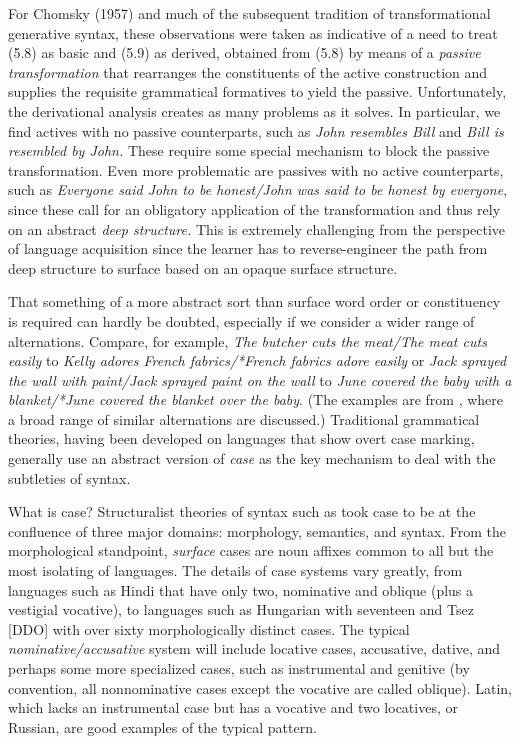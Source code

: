 For Chomsky (1957) and much of the subsequent tradition of transformational
generative syntax, these observations were taken as indicative of a need to
treat (5.8) as basic and (5.9) as derived, obtained from (5.8) by means of a
{\it passive transformation}  that rearranges
the constituents of the active construction and supplies the requisite
grammatical formatives to yield the passive. Unfortunately, the derivational
analysis creates as many problems as it solves. In particular, we find actives
with no passive counterparts, such as {\it John resembles Bill} and {\it *Bill
  is resembled by John.} These require some special mechanism to block the
passive transformation.  Even more problematic are passives with no active
counterparts, such as {\it *Everyone said John to be honest/John was said to be
  honest by everyone}, since these call for an obligatory application of the
transformation and thus rely on an abstract {\it deep structure.} This is
extremely challenging from the perspective of language acquisition since the
learner has to reverse-engineer the path from deep structure to surface based
on an opaque surface structure. 

That something of a more abstract sort than surface word order or constituency
is required can hardly be doubted, especially if we consider a wider range of
alternations. Compare, for example, {\it The butcher cuts the meat/The meat
cuts easily} to {\it Kelly adores French fabrics/*French fabrics adore easily}
or {\it Jack sprayed the wall with paint/Jack sprayed paint on the wall} to
{\it June covered the baby with a blanket/*June covered the blanket over the
baby}. (The examples are from \cite{Levin:1993}, where a broad range of
similar alternations are discussed.) Traditional grammatical theories, having
been developed on languages that show overt case marking, generally use an
abstract version of {\it case} as the key mechanism to deal with the
subtleties of syntax. 

What is case? Structuralist theories of syntax such as 
took case to be at the confluence of three major domains: morphology,
semantics, and syntax. From the morphological standpoint, {\it surface} cases
are noun affixes common to all but the most isolating of languages. The
details of case systems vary greatly, from languages such as Hindi that have
only two, nominative and oblique (plus a vestigial vocative), to languages
such as Hungarian with seventeen and Tsez [DDO] with over sixty
morphologically distinct cases. The typical {\it nominative/accusative} system
will include locative cases, accusative, dative, and perhaps some more
specialized cases, such as instrumental and genitive (by convention, all
nonnominative cases except the vocative are called oblique).  Latin, which
lacks an instrumental case but has a vocative and two locatives, or Russian,
are good examples of the typical pattern.  
   
  
    

